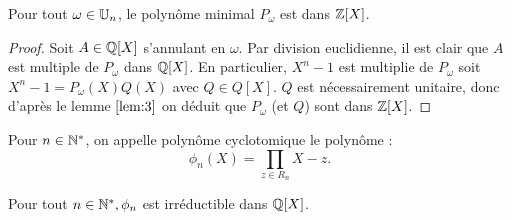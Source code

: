 \begin{lem}
\label{lem:6}
Pour tout $\omega \in \mathbb{U}_n$, le polynôme minimal $P_\omega$ est dans $\mathbb{Z}[X]$.
\end{lem}

\begin{proof}
Soit $A \in \mathbb{Q}[X]$ s'annulant en $\omega$. Par division euclidienne, il est clair que $A$ est multiple de $P_\omega$ dans $\mathbb{Q}[X]$.
En particulier, $X^n-1$ est multiplie de $P_\omega$ soit $X^n-1 = P_\omega(X) Q(X)$ avec $Q \in Q[X]$.
$Q$ est nécessairement unitaire, donc d'après le lemme $\ref{lem:3}$ on déduit que  $P_\omega$ (et $Q$) sont dans $\mathbb{Z}[X]$.
\end{proof}

\begin{defn}
Pour $n \in \mathbb{N}^\ast$, on appelle polynôme cyclotomique le polynôme :
\[ \phi_n(X) = \prod_{z \in R_n} X-z . \]
\end{defn}

\begin{thm}
Pour tout $n \in \mathbb{N}^\ast, \phi_n$ est irréductible dans $\mathbb{Q}[X]$.
\end{thm}

